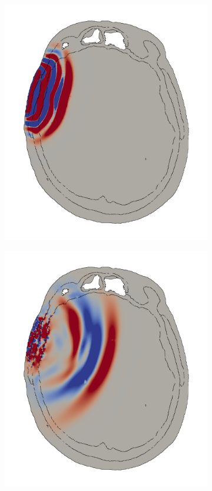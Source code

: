 \documentclass[a4paper]{article}
\numberwithin{equation}{section}
\begin{document}
\begin{figure}[H]
\centering
\begin{subfigure}{.18\textwidth}
  \centering
  \includegraphics[width=1.0\linewidth]{pictures/skull/elastic-pressure-z-with-bounds/six/1.png}
\end{subfigure}
\begin{subfigure}{.18\textwidth}
  \centering
  \includegraphics[width=1.0\linewidth]{pictures/skull/elastic-pressure-z-with-bounds/six/2.png}

\end{subfigure}
\end{figure}
\end{document}
